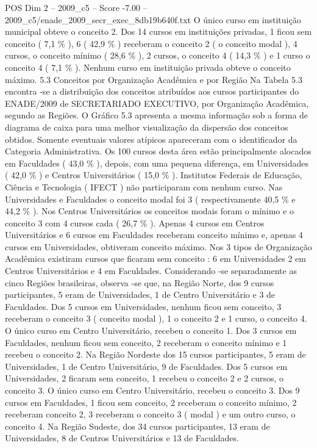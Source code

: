 \begin{textsample}{POS Dim 2 – 2009\_c5 – Score -7.00 – 2009\_c5/enade\_2009\_secr\_exec\_8db19b640f.txt}
O único curso em instituição municipal obteve o conceito 2.
Dos 14 cursos em instituições privadas, 1 ficou sem conceito ( 7,1 \% ), 6 ( 42,9 \% ) receberam o conceito 2 ( o conceito modal ), 4 cursos, o conceito mínimo ( 28,6 \% ), 2 cursos, o conceito 4 ( 14,3 \% ) e 1 curso o conceito 4 ( 7,1 \% ).
Nenhum curso em instituição privada obteve o conceito máximo. 5.3 Conceitos por Organização Acadêmica e por Região Na Tabela 5.3 encontra -se a distribuição dos conceitos atribuídos aos cursos participantes do ENADE/2009 de SECRETARIADO EXECUTIVO, por Organização Acadêmica, segundo as Regiões.
O Gráfico 5.3 apresenta a mesma informação sob a forma de diagrama de caixa para uma melhor visualização da dispersão dos conceitos obtidos.
Somente eventuais valores atípicos apareceram com o identificador da Categoria Administrativa.
Os 100 cursos desta área estão principalmente alocados em Faculdades ( 43,0 \% ), depois, com uma pequena diferença, em Universidades ( 42,0 \% ) e Centros Universitários ( 15,0 \% ).
Institutos Federais de Educação, Ciência e Tecnologia ( IFECT ) não participaram com nenhum curso.
Nas Universidades e Faculdades o conceito modal foi 3 ( respectivamente 40,5 \% e 44,2 \% ).
Nos Centros Universitários os conceitos modais foram o mínimo e o conceito 3 com 4 cursos cada ( 26,7 \% ).
Apenas 4 cursos em Centros Universitários e 6 cursos em Faculdades receberam conceito mínimo e, apenas 4 cursos em Universidades, obtiveram conceito máximo.
Nos 3 tipos de Organização Acadêmica existiram cursos que ficaram sem conceito : 6 em Universidades 2 em Centros Universitários e 4 em Faculdades.
Considerando -se separadamente as cinco Regiões brasileiras, observa -se que, na Região Norte, dos 9 cursos participantes, 5 eram de Universidades, 1 de Centro Universitário e 3 de Faculdades.
Dos 5 cursos em Universidades, nenhum ficou sem conceito, 3 receberam o conceito 3 ( conceito modal ), 1 o conceito 2 e 1 curso, o conceito 4.
O único curso em Centro Universitário, recebeu o conceito 1.
Dos 3 cursos em Faculdades, nenhum ficou sem conceito, 2 receberam o conceito mínimo e 1 recebeu o conceito 2.
Na Região Nordeste dos 15 cursos participantes, 5 eram de Universidades, 1 de Centro Universitário, 9 de Faculdades.
Dos 5 cursos em Universidades, 2 ficaram sem conceito, 1 recebeu o conceito 2 e 2 cursos, o conceito 3.
O único curso em Centro Universitário, recebeu o conceito 3.
Dos 9 cursos em Faculdades, 1 ficou sem conceito, 2 receberam o conceito mínimo, 2 receberam conceito 2, 3 receberam o conceito 3 ( modal ) e um outro curso, o conceito 4.
Na Região Sudeste, dos 34 cursos participantes, 13 eram de Universidades, 8 de Centros Universitários e 13 de Faculdades.

\end{textsample}
